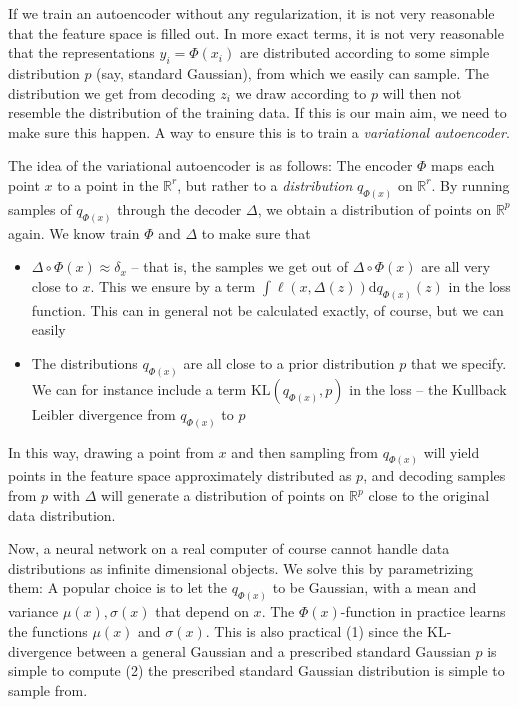 \documentclass{article}
\newcommand{\R}{\mathbb{R}}
\begin{document}
If we train an autoencoder without any regularization, it is not very reasonable that the feature space is filled out. In more exact terms, it is not very reasonable that the representations $y_i=\Phi(x_i)$ are distributed according to some simple distribution $p$ (say, standard Gaussian), from which we easily can sample. The distribution we get from decoding $z_i$ we draw according to $p$ will then not resemble the distribution of the training data. If this is our main aim, we need to make sure this happen. A way to ensure this is to train a \emph{variational autoencoder}. 

The idea of the variational autoencoder is as follows: The encoder $\Phi$ maps each point $x$ to a point in the $\R^r$, but rather to a \emph{distribution} $q_{\Phi(x)}$ on $\R^r$. By running samples of $q_{\Phi(x)}$ through the decoder $\Delta$, we obtain a distribution of points on $\R^p$ again. We know train $\Phi$ and $\Delta$ to make sure that
\begin{itemize}
    \item $\Delta \circ \Phi(x) \approx \delta_x$ -- that is, the samples we get out of $\Delta \circ \Phi(x)$ are all very close to $x$. This we ensure by a term $\int\ell(x,\Delta(z))\mathrm{d} q_{\Phi(x)}(z)$ in the loss function. This can in general not be calculated exactly, of course, but we can easily 
    \item The distributions $q_{\Phi(x)}$ are all close to a prior distribution $p$ that we specify. We can for instance include a term $\mathrm{KL}(q_{\Phi(x)},p)$ in the loss -- the Kullback Leibler divergence from $q_{\Phi(x)}$ to $p$
\end{itemize}
In this way, drawing a point from $x$ and then sampling from $q_{\Phi(x)}$ will yield points in the feature space approximately distributed as $p$, and decoding samples from $p$ with $\Delta$ will generate a distribution of points on $\R^p$ close to the original data distribution.

Now, a neural network on a real computer of course cannot handle data distributions as infinite dimensional objects. We solve this by parametrizing them: A popular choice is to let the $q_{\Phi(x)}$ to be Gaussian, with a mean and variance $\mu(x),\sigma(x)$ that depend on $x$. The $\Phi(x)$-function in practice learns the functions $\mu(x)$ and $\sigma(x)$. This is also practical (1) since the KL-divergence between a general Gaussian and a prescribed standard Gaussian $p$ is simple to compute (2) the prescribed standard Gaussian distribution is simple to sample from.
\end{document}
